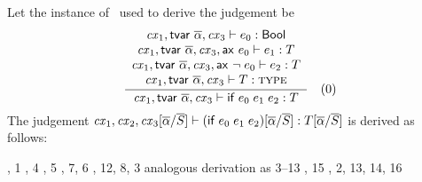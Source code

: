 \begin{bycase}
\Case{\Reif}\\
Let the instance of \Reif\ used to derive the judgement be
\[
\frac{\begin{array}{c}\mathit{cx}_1,\mathsf{tvar}\ \overline{\alpha},\mathit{cx}_3\vdash e_0:\mathsf{Bool}\\\mathit{cx}_1,\mathsf{tvar}\ \overline{\alpha},\mathit{cx}_3,\mathsf{ax}\ e_0\vdash e_1:T\\\mathit{cx}_1,\mathsf{tvar}\ \overline{\alpha},\mathit{cx}_3,\mathsf{ax}\ \neg\;e_0\vdash e_2:T\\\mathit{cx}_1,\mathsf{tvar}\ \overline{\alpha},\mathit{cx}_3\vdash T:\textsc{type}\end{array}}{\mathit{cx}_1,\mathsf{tvar}\ \overline{\alpha},\mathit{cx}_3\vdash\mathsf{if}\;e_0\;e_1\;e_2:T}\quad\mbox{(0)}
\]
The judgement
$\mathit{cx}_1,\mathit{cx}_2,\mathit{cx}_3[\overline{\alpha}/\overline{S}]\vdash(\mathsf{if}\;e_0\;e_1\;e_2)[\overline{\alpha}/\overline{S}]:T[\overline{\alpha}/\overline{S}]$
is derived as follows:
\begin{derivation}
     {\indhyp, 1}
     {, 4}
     {\indhyp, 5}
     {\Rcxax, 7, 6}
     {\indhyp, 12, 8, 3}
     {analogous derivation as 3--13}
     {\indhyp, 15}
     {\Reif, 2, 13, 14, 16}
\end{derivation}


\end{bycase}
